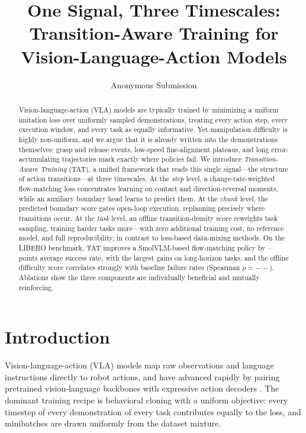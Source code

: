 \documentclass[letterpaper]{article} %
\title{One Signal, Three Timescales: Transition-Aware Training for Vision-Language-Action Models}
\author{
    Anonymous Submission
}
\newcommand{\method}{TAT} %
\newcommand{\libero}{LIBERO}
\newcommand{\na}{--}      %
\begin{document}
\maketitle

\begin{abstract}
Vision-language-action (VLA) models are typically trained by minimizing a uniform imitation loss over uniformly sampled demonstrations, treating every action step, every execution window, and every task as equally informative. Yet manipulation difficulty is highly non-uniform, and we argue that it is already written into the demonstrations themselves: grasp and release events, low-speed fine-alignment plateaus, and long error-accumulating trajectories mark exactly where policies fail. We introduce \emph{Transition-Aware Training} (\method{}), a unified framework that reads this single signal---the structure of action transitions---at three timescales. At the \emph{step} level, a change-rate-weighted flow-matching loss concentrates learning on contact and direction-reversal moments, while an auxiliary boundary head learns to predict them. At the \emph{chunk} level, the predicted boundary score gates open-loop execution, replanning precisely where transitions occur. At the \emph{task} level, an offline transition-density score reweights task sampling, training harder tasks more---with zero additional training cost, no reference model, and full reproducibility, in contrast to loss-based data-mixing methods. On the \libero{} benchmark, \method{} improves a SmolVLM-based flow-matching policy by \na{} points average success rate, with the largest gains on long-horizon tasks, and the offline difficulty score correlates strongly with baseline failure rates (Spearman $\rho=\na{}$). Ablations show the three components are individually beneficial and mutually reinforcing.
\end{abstract}

\section{Introduction}

Vision-language-action (VLA) models map raw observations and language instructions directly to robot actions, and have advanced rapidly by pairing pretrained vision-language backbones with expressive action decoders \cite{brohan2023rt2,kim2024openvla,octo2024,black2024pi0}. The dominant training recipe is behavioral cloning with a uniform objective: every timestep of every demonstration of every task contributes equally to the loss, and minibatches are drawn uniformly from the dataset mixture.
\end{document}
